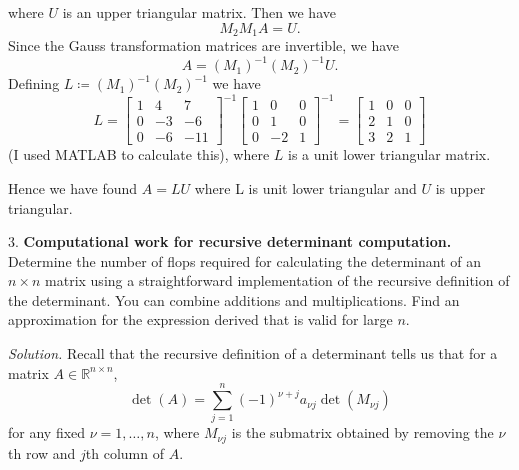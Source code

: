 \documentclass{article}
\newcommand{\R}{\mathbb{R}}
\begin{document}
%
where $U$ is an upper triangular matrix. Then we have
%
\begin{equation*}
    M_2 M_1 A = U
    .
\end{equation*}
%
Since the Gauss transformation matrices are invertible,
we have
%
\begin{equation*}
    A = (M_1)^{-1} (M_2)^{-1} U
    .
\end{equation*}
%
Defining $L \coloneqq (M_1)^{-1} (M_2)^{-1}$ we have
%
\begin{equation*}
    L =
    \begin{bmatrix}
        1 & 4 & 7 \\
        0 & -3 & -6 \\
        0 & -6 & -11
    \end{bmatrix}^{-1}
    \begin{bmatrix}
        1 & 0 & 0 \\
        0 & 1 & 0 \\
        0 & -2 & 1
    \end{bmatrix}^{-1}
    =
    \begin{bmatrix}
        1 & 0 & 0 \\
        2 & 1 & 0 \\
        3 & 2 & 1
    \end{bmatrix}
\end{equation*}
%
(I used MATLAB to calculate this), where $L$ is a unit lower triangular matrix.

Hence we have found $A = LU$ where L is unit lower triangular and
$U$ is upper triangular.

\newpage

3. \textbf{Computational work for recursive determinant computation.}
Determine the number of flops required for calculating the determinant
of an $n \times n$ matrix using a straightforward implementation of the recursive
definition of the determinant. You can combine additions and multiplications.
Find an approximation for the expression derived that is valid for large $n$.

\textit{Solution.}
Recall that the recursive definition of a determinant tells us that
for a matrix $A \in \R^{n \times n}$,
%
\begin{equation*}
    \det(A) = \sum_{j = 1}^n (-1)^{\nu + j} a_{\nu j} \det(M_{\nu j})
\end{equation*}
%
for any fixed $\nu = 1, \ldots, n$, where $M_{\nu j}$ is the
submatrix obtained by removing the $\nu$th row and $j$th column of $A$.
\end{document}
